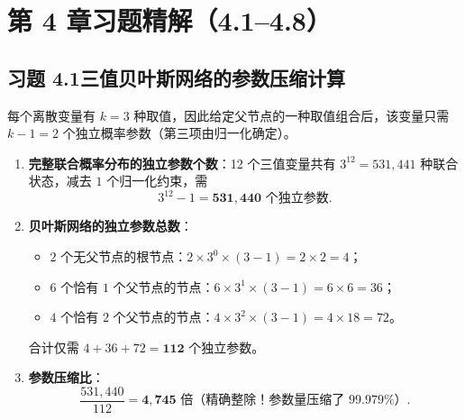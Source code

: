 \section{第 4 章习题精解（4.1--4.8）}

\subsection*{习题 4.1\quad 三值贝叶斯网络的参数压缩计算}
每个离散变量有 $k=3$ 种取值，因此给定父节点的一种取值组合后，该变量只需 $k-1 = 2$ 个独立概率参数（第三项由归一化确定）。
\begin{enumerate}[label=(\arabic*), leftmargin=1.8em]
  \item \textbf{完整联合概率分布的独立参数个数}：12 个三值变量共有 $3^{12} = 531{,}441$ 种联合状态，减去 $1$ 个归一化约束，需
  \[
    3^{12} - 1 = \mathbf{531{,}440}\text{ 个独立参数}.
  \]
  \item \textbf{贝叶斯网络的独立参数总数}：
  \begin{itemize}
    \item $2$ 个无父节点的根节点：$2 \times 3^0 \times (3 - 1) = 2 \times 2 = 4$；
    \item $6$ 个恰有 $1$ 个父节点的节点：$6 \times 3^1 \times (3 - 1) = 6 \times 6 = 36$；
    \item $4$ 个恰有 $2$ 个父节点的节点：$4 \times 3^2 \times (3 - 1) = 4 \times 18 = 72$。
  \end{itemize}
  合计仅需 $4 + 36 + 72 = \mathbf{112}$ 个独立参数。
  \item \textbf{参数压缩比}：
  \[
    \frac{531{,}440}{112} = \mathbf{4{,}745}\text{ 倍（精确整除！参数量压缩了 } 99.979\%\text{）}.
  \]
\end{enumerate}

